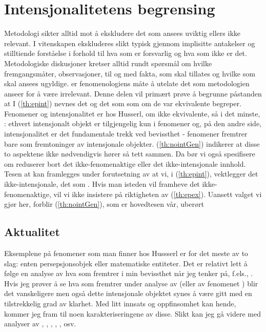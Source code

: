 \section{Intensjonalitetens begrensing}\label{sec:limits}
Metodologi sikter alltid mot {\aa} ekskludere det som ansees uviktig 
ellers ikke relevant. I vitenskapen ekskluderes slikt typisk gjennom 
implisitte antakelser og stilltiende forst{\aa}else i forhold til hva 
som er forsvarlig og hva som ikke er det. Metodologiske diskusjoner 
kretser alltid rundt sp{\o}rsm{\aa}l om hvilke fremgangsm{\aa}ter, 
observasjoner, til og med fakta, som skal tillates og hvilke som skal ansees 
ugyldige.  er fenomenologiens m{\aa}te {\aa} 
utelate det som metodologien anseer for {\aa} v{\ae}re irrelevant. 
Denne delen vil prim{\ae}rt pr{\o}ve {\aa} begrunne p{\aa}standen at 
%
%
I (\ref{th:epint}) nevnes det  og det som 
 som om de var 
ekvivalente begreper. Fenomener og intensjonalitet er hos Husserl, om 
ikke ekvivalente, s{\aa} i det minste, : ethvert 
intensjonalt objekt er tilgjengelig kun i fenomener og, p{\aa} 
den andre side, intensjonalitet er det fundamentale trekk ved 
bevissthet - fenomener fremtrer bare som fremtoninger av intensjonale 
objekter.
(\ref{th:nointGen}) indikerer at disse to aspektene ikke 
n{\o}dvendigvis h{\o}rer s{\aa} tett sammen. Da b{\o}r vi ogs{\aa} 
spesifisere om  reduserer bort det ikke-fenomenaktige 
eller det ikke-intensjonale innhold.
Tesen at
kan framlegges under forutsetning av at vi, i (\ref{th:epint}), 
vektlegger det ikke-intensjonale, det som . Hvis man isteden vil framheve det 
ikke-fenomenaktige, vil vi ikke insistere p{\aa} riktigheten av 
(\ref{th:epex}). Uansett valget vi gj{\o}r her, forblir 
(\ref{th:nointGen}), som er hovedtesen v{\aa}r, uber{\o}rt
%
\subsection{Aktualitet}
Eksemplene p{\aa} fenomener som man finner hos Hussserl er for det 
meste av to slag: enten persepsjonsobjek eller matematiske entiteter. 
Det er relativt lett {\aa} f{\o}lge en analyse av hva som fremtrer i 
min bevissthet n{\aa}r jeg tenker p{\aa}, f.els., . Hvis jeg pr{\o}ver {\aa} se hva som fremtrer under 
analyse av  (eller  av fenomenet 
) blir det vanskeligere men ogs{\aa} dette intensjonale 
objektet synes {\aa} v{\ae}re gitt med en tilstrekkelig grad av 
klarhet. Med litt innsats og oppfinsomhet kan hende, kommer jeg fram 
til noen  karakteriseringene av disse. Slikt kan jeg 
g{\aa} videre med analyser av , 
, , , 
, osv.

